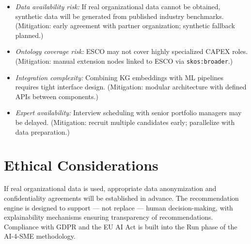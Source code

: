 \begin{itemize}
  \item \textit{Data availability risk:} If real organizational data cannot be obtained,
        synthetic data will be generated from published industry benchmarks.
        (Mitigation: early agreement with partner organization; synthetic fallback planned.)
  \item \textit{Ontology coverage risk:} ESCO may not cover highly specialized CAPEX roles.
        (Mitigation: manual extension nodes linked to ESCO via \texttt{skos:broader}.)
  \item \textit{Integration complexity:} Combining KG embeddings with ML pipelines requires
        tight interface design. (Mitigation: modular architecture with defined APIs between
        components.)
  \item \textit{Expert availability:} Interview scheduling with senior portfolio managers
        may be delayed. (Mitigation: recruit multiple candidates early; parallelize with
        data preparation.)
\end{itemize}

\section{Ethical Considerations}
\label{sec:ethics}

If real organizational data is used, appropriate data anonymization and confidentiality agreements
will be established in advance. The recommendation engine is designed to support — not replace —
human decision-making, with explainability mechanisms ensuring transparency of recommendations.
Compliance with GDPR and the EU AI Act is built into the Run phase of the AI-4-SME methodology.
